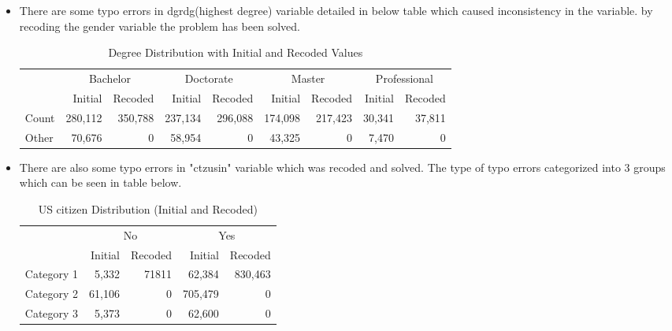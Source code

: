 \documentclass[12pt]{article}
\begin{document}
\begin{itemize}
    \item There are some typo errors in dgrdg(highest degree) variable detailed in below table which caused inconsistency in the variable. by recoding the gender variable the problem has been solved.

\begin{table}[h]
    \begin{flushright}  %
    \renewcommand{\arraystretch}{1.2} %
    \setlength{\tabcolsep}{8pt} %
    \begin{tabular}{|l|r|r|r|r|r|r|r|r|}
        \hline
        & \multicolumn{2}{c|}{Bachelor} & \multicolumn{2}{c|}{Doctorate} & \multicolumn{2}{c|}{Master} & \multicolumn{2}{c|}{Professional} \\
        \cline{2-9}
        & Initial & Recoded & Initial & Recoded & Initial & Recoded & Initial & Recoded \\
        \hline
        Count & 280,112 & 350,788 & 237,134 & 296,088 & 174,098 & 217,423 & 30,341 & 37,811 \\
        \hline
        Other & 70,676 & 0 & 58,954 & 0 & 43,325 & 0 & 7,470 & 0 \\
        \hline
    \end{tabular}
    \caption{Degree Distribution with Initial and Recoded Values}
    \label{tab:degree_dist}
    \end{flushright}
\end{table}

    \item There are also some typo errors in "ctzusin" variable which was recoded and solved. The type of typo errors categorized into 3 groups which can be seen in table below.
\begin{table}[h]
    \begin{flushright}  %
    \renewcommand{\arraystretch}{1.2} %
    \setlength{\tabcolsep}{8pt} %
    \begin{tabular}{|l|r|r|r|r|}
        \hline
        & \multicolumn{2}{c|}{No} & \multicolumn{2}{c|}{Yes} \\
        \cline{2-5}
        & Initial & Recoded & Initial & Recoded  \\
        \hline
        Category 1 & 5,332 & 71811 & 62,384 & 830,463 \\
        \hline
        Category 2 & 61,106 & 0 & 705,479 & 0 \\
        \hline
        Category 3 & 5,373 & 0 & 62,600 & 0 \\
        \hline
        \end{tabular}
    \caption{US citizen Distribution (Initial and Recoded)}
    \label{tab:degree_dist}
    \end{flushright}
\end{table}


\end{itemize}
\end{document}
